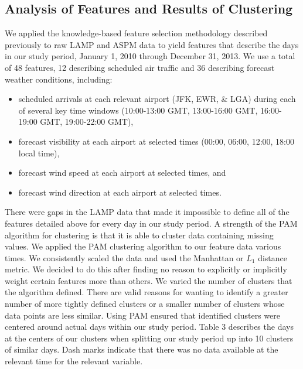 \documentclass[11pt]{scrartcl}
\begin{document}
\subsection{Analysis of Features and Results of Clustering}
We applied the knowledge-based feature selection methodology described previously to raw LAMP and ASPM data to yield features that describe the days in our study period, January 1, 2010 through December 31, 2013.  We use a total of 48 features, 12 describing scheduled air traffic and 36 describing forecast weather conditions, including:
\begin{itemize}
\item{scheduled arrivals at each relevant airport (JFK, EWR, \& LGA) during each of several key time windows (10:00-13:00 GMT, 13:00-16:00 GMT, 16:00-19:00 GMT, 19:00-22:00 GMT),}
\item{forecast visibility at each airport at selected times (00:00, 06:00, 12:00, 18:00 local time),}
\item{forecast wind speed at each airport at selected times, and}
\item{forecast wind direction at each airport at selected times.}
\end{itemize}
There were gaps in the LAMP data that made it impossible to define all of the features detailed above for every day in our study period.  A strength of the PAM algorithm for clustering is that it is able to cluster data containing missing values.  We applied the PAM clustering algorithm to our feature data various times.  We consistently scaled the data and used the Manhattan or $L_1$ distance metric.  We decided to do this after finding no reason to explicitly or implicitly weight certain features more than others.  We varied the number of clusters that the algorithm defined.  There are valid reasons for wanting to identify a greater number of more tightly defined clusters or a smaller number of clusters whose data points are less similar.  Using PAM ensured that identified clusters were centered around actual days within our study period.  Table 3 describes the days at the centers of our clusters when splitting our study period up into 10 clusters of similar days.  Dash marks indicate that there was no data available at the relevant time for the relevant variable.
\end{document}
